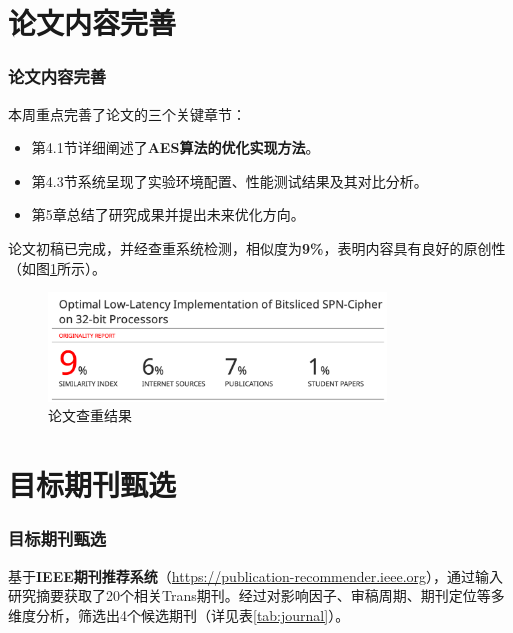 \documentclass{beamer}
\begin{document}
\section{论文内容完善}
\begin{frame}
    \frametitle{论文内容完善}
    本周重点完善了论文的三个关键章节：
    \begin{itemize}
        \item 第4.1节详细阐述了\textbf{AES算法的优化实现方法}。
        \item 第4.3节系统呈现了实验环境配置、性能测试结果及其对比分析。
        \item 第5章总结了研究成果并提出未来优化方向。
    \end{itemize}
    
    论文初稿已完成，并经查重系统检测，相似度为\textbf{9\%}，表明内容具有良好的原创性（如图\ref{fig:check}所示）。

    \begin{figure}
        \centering
        \includegraphics[width=0.8\textwidth]{./fig/duplicate_9.png}
        \caption{论文查重结果}
        \label{fig:check}
    \end{figure}
\end{frame}

\section{目标期刊甄选}
\begin{frame}
    \frametitle{目标期刊甄选}
    基于\textbf{IEEE期刊推荐系统}（\url{https://publication-recommender.ieee.org}），通过输入研究摘要获取了20个相关Trans期刊。经过对影响因子、审稿周期、期刊定位等多维度分析，筛选出4个候选期刊（详见表\ref{tab:journal}）。
\end{frame}
\end{document}
